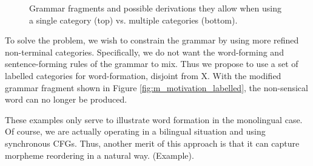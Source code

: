 \begin{figure}[h]
  \caption{Grammar fragments and possible derivations they allow when using a single category (top) vs. multiple categories (bottom).}
  \label{fig:m_motivation}
\end{figure}
\subfigcapskip=10pt

To solve the problem, we wish to constrain the grammar by using more refined non-terminal categories.
Specifically, we do not want the word-forming and sentence-forming rules of the grammar to mix.
Thus we propose to use a set of labelled categories for word-formation, disjoint from X.
With the modified grammar fragment shown in Figure \ref{fig:m_motivation_labelled}, the non-sensical word can no longer be produced.

These examples only serve to illustrate word formation in the monolingual case.
Of course, we are actually operating in a bilingual situation and using synchronous CFGs.
Thus, another merit of this approach is that it can capture morpheme reordering in a natural way. (Example).

